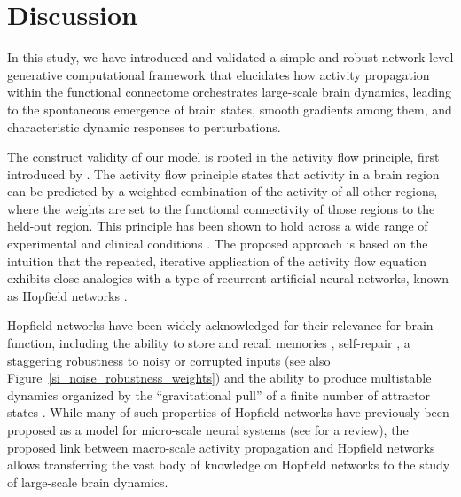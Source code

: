 \documentclass{article}
\begin{document}
\section{Discussion}

In this study, we have introduced and validated a simple and robust network-level generative computational framework that elucidates how activity propagation within the functional connectome orchestrates large-scale brain dynamics, leading to the spontaneous emergence of brain states, smooth gradients among them, and characteristic dynamic responses to perturbations.

The construct validity of our model is rooted in the activity flow principle, first introduced by \citet{cole2016activity}. The activity flow principle states that activity in a brain region can be predicted by a weighted combination of the activity of all other regions, where the weights are set to the functional connectivity of those regions to the held-out region. This principle has been shown to hold across a wide range of experimental and clinical conditions \citep{cole2016activity, ito2017cognitive, mill2022network, hearne2021activity, chen2018human}.
The proposed approach is based on the intuition that the repeated, iterative application of the activity flow equation exhibits close analogies with a type of recurrent artificial neural networks, known as Hopfield networks \citep{hopfield1982neural}.

Hopfield networks have been widely acknowledged for their relevance for brain function, including the ability to store and recall memories \citep{hopfield1982neural}, self-repair \citep{murre2003selfreparing},
a staggering robustness to noisy or corrupted inputs \citep{hertz1991introduction} (see also Figure~\ref{si_noise_robustness_weights}) and the ability to produce multistable dynamics organized by the ``gravitational pull'' of a finite number of attractor states \citep{khona2022attractor}. While many of such properties of Hopfield networks have previously been proposed as a model for micro-scale neural systems (see \cite{khona2022attractor} for a review), the proposed link between macro-scale activity propagation and Hopfield networks allows transferring the vast body of knowledge on Hopfield networks to the study of large-scale brain dynamics.
\end{document}
